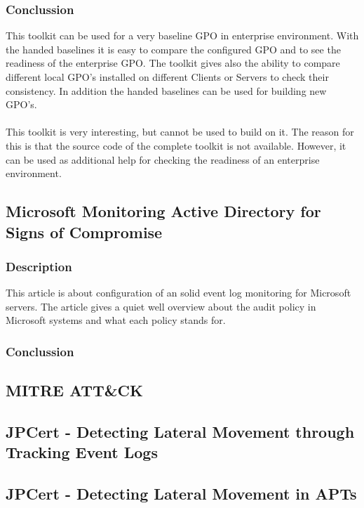 \subsubsection{Conclussion}
This toolkit can be used for a very baseline GPO in enterprise environment. With the handed baselines it is easy to compare the configured GPO and to see the readiness of the enterprise GPO. The toolkit gives also the ability to compare different local GPO's installed on different Clients or Servers to check their consistency. In addition the handed baselines can be used for building new GPO's.
\\\\
This toolkit is very interesting, but cannot be used to build on it. The reason for this is that the source code of the complete toolkit is not available. However, it can be used as additional help for checking the readiness of an enterprise environment.

\subsection{Microsoft Monitoring Active Directory for Signs of Compromise
}%
\subsubsection{Description}
This article \cite{MSADSignsOfCompromise} is about configuration of an solid event log monitoring for Microsoft servers. The article gives a quiet well overview about the audit policy in Microsoft systems and what each policy stands for. 

\subsubsection{Conclussion}

\subsection{MITRE ATT\&CK}

\subsection{JPCert - Detecting Lateral Movement through Tracking Event Logs}

\subsection{JPCert - Detecting Lateral Movement in APTs}

